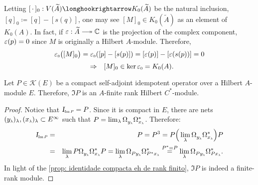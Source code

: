 Letting $[\,\cdot\,]_0 : V({\widetilde{A}}) \longhookrightarrow K_0({\widetilde{A}})$ be the natural inclusion, $[q]_0 \coloneqq [q]- [s(q)]$, one may see $[M]_0 \in K_0({\widetilde{A}})$ as an element of $K_0(A)$. In fact, if $\ep : \widetilde A \longtwoheadrightarrow \C$ is the projection of the complex component, $\operatorname{{\varepsilon}}(p) = 0$ since $M$ is originally a Hilbert $A$-module. Therefore,
\[
\sub\ep0\big([M]_0\big) = \sub\ep0([p] - [s(p)]) = [\ep(p)]- [\ep(s(p))] = 0 
\]
\[
\To [M]_0 \in \ker \sub\ep0 = K_0(A).
\]

\begin{proposicao}\label{prop: compacto idempotente eh rank finito}
Let $P \in \mathscr K(E)$ be a compact self-adjoint idempotent operator over a Hilbert $A$-module $E$. Therefore, $\Im P$ is an $A$-finite rank Hilbert $C^*$-module.
\begin{proof}
Notice that $\sub{\Id}{\Im P} = P$. Since it is compact in $E$, there are nets $(\sub y\lambda)_\lambda, (\sub x\lambda)_\lambda \subset E^{\infty}$ such that $P = \lim_\lambda \Omega_{\sub y\lambda}^{\vphantom{*}}\Omega_{\sub x\lambda}^*$. Therefore:
\begin{eqnarray*}
\sub{\Id}{\Im P} &=& P = P^3 = P\Big(\lim_\lambda \Omega_{\sub y\lambda}^{\vphantom{*}}\Omega_{\sub x\lambda}^*\Big)P\\
&=& \lim_\lambda P\Omega_{\sub y\lambda}^{\vphantom{*}}\Omega_{\sub x\lambda}^*P =  \lim_\lambda \Omega_{P\sub y\lambda}^{\vphantom{*}}\Omega_{P^*\sub x\lambda}^*
\overset{P^*=P}= \lim_\lambda \Omega_{P\sub y\lambda}^{\vphantom{*}}\Omega_{P\sub x\lambda}^*.
\end{eqnarray*}
In light of the \ref{prop: identidade compacta eh de rank finito}, ${\Im P}$ is indeed a finite-rank module.
\end{proof}
\end{proposicao}


